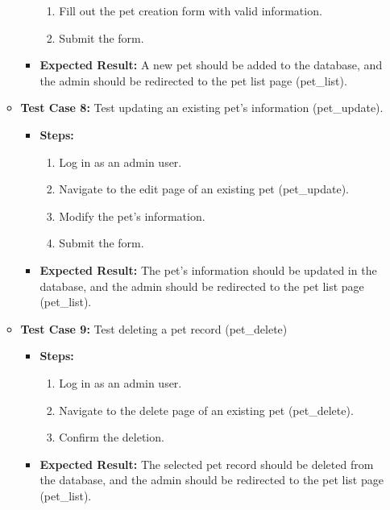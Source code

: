 \begin{enumerate}
\begin{itemize}
\begin{itemize}
\begin{enumerate}
                \item Fill out the pet creation form with valid information.
                \item Submit the form.
            \end{enumerate}
            \item \textbf{Expected Result:} A new pet should be added to the database, and the admin should be redirected to the pet list page (pet\_list).
        \end{itemize}
        \item \textbf{Test Case 8:} Test updating an existing pet's information (pet\_update).
        \begin{itemize}
            \item \textbf{Steps:}
            \begin{enumerate}
                \item Log in as an admin user.
                \item Navigate to the edit page of an existing pet (pet\_update).
                \item Modify the pet's information.
                \item Submit the form.
            \end{enumerate}
            \item \textbf{Expected Result:} The pet's information should be updated in the database, and the admin should be redirected to the pet list page (pet\_list).
        \end{itemize}
        \item \textbf{Test Case 9:} Test deleting a pet record (pet\_delete)
        \begin{itemize}
            \item \textbf{Steps:}
            \begin{enumerate}
                \item Log in as an admin user.
                \item Navigate to the delete page of an existing pet (pet\_delete).
                \item Confirm the deletion.
            \end{enumerate}
            \item \textbf{Expected Result:} The selected pet record should be deleted from the database, and the admin should be redirected to the pet list page (pet\_list).
        \end{itemize}
    \end{itemize}

\end{enumerate}

